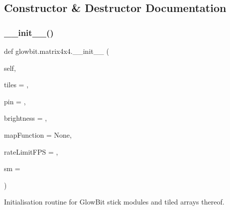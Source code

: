 \subsection{Constructor \& Destructor Documentation}
\mbox{\label{classglowbit_1_1matrix4x4_ac2df92961032072572d1e4e8b98ede14}} 
\subsubsection{\texorpdfstring{\+\_\+\+\_\+init\+\_\+\+\_\+()}{\_\_init\_\_()}}
{\footnotesize\ttfamily def glowbit.\+matrix4x4.\+\_\+\+\_\+init\+\_\+\+\_\+ (\begin{DoxyParamCaption}\item[{}]{self,  }\item[{}]{tiles = {},  }\item[{}]{pin = {},  }\item[{}]{brightness = {},  }\item[{}]{map\+Function = {\ttfamily None},  }\item[{}]{rate\+Limit\+F\+PS = {},  }\item[{}]{sm = {} }\end{DoxyParamCaption})}



Initialisation routine for Glow\+Bit stick modules and tiled arrays thereof. 



